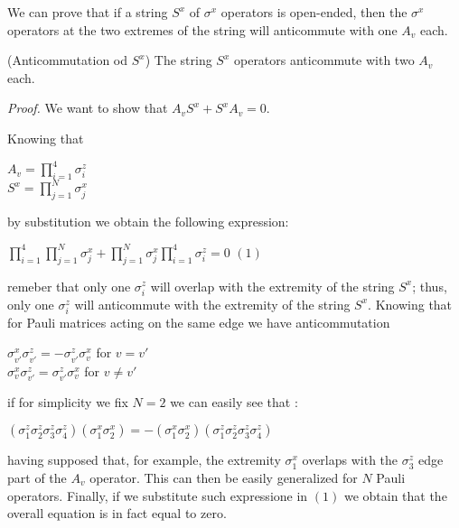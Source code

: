 




\newpage
We can prove that if a string $S^x$ of $\sigma^x$ operators is open-ended, then the $\sigma^x$ operators at the two extremes of the string will anticommute with one $A_v$ each. 

\begin{proposition}(Anticommutation od $S^x$)
	The string $S^x$ operators anticommute with two $A_v$ each.
\end{proposition}

\textit{Proof.}\newline
We want to show that $A_v S^x + S^x A_v=0$.\newline

Knowing that 

\begin{center}
	$A_v = \prod_{i=1}^{4} \sigma_i^z$ \\ 
	$S^x = \prod_{j=1}^{N} \sigma_j^x$
\end{center}

by substitution we obtain the following expression: \newline

\begin{center}
	$\prod_{i=1}^{4} \prod_{j=1}^{N} \sigma_j^x + \prod_{j=1}^{N} \sigma_j^x \prod_{i=1}^{4} \sigma_i^z = 0$ $(1)$
\end{center}

remeber that only one $\sigma_i^z$ will overlap with the extremity of the string $S^x$; thus, only one $\sigma_i^z$ will anticommute with the extremity of the string $S^x$. Knowing that for Pauli matrices acting on the same edge we have anticommutation

\begin{center}
	$\sigma_{v'}^x \sigma_{v'}^z = - \sigma_{v'}^z \sigma_v^x$ for $v=v'$ \\
	$\sigma_v^x \sigma_{v'}^z =  \sigma_{v'}^z \sigma_v^x$ for $v \neq v'$ 
\end{center}

if for simplicity we fix $N=2$ we can easily see that :\newline

\begin{center}
	$(\sigma_1^z \sigma_2^z \sigma_3^z \sigma_4^z)(\sigma_1^x \sigma_2^x)  = - (\sigma_1^x \sigma_2^x)(\sigma_1^z \sigma_2^z \sigma_3^z \sigma_4^z) $ 
\end{center}

having supposed that, for example, the extremity $\sigma_1^x$ overlaps with the $\sigma_3^z$ edge part of the $A_v$ operator. This can then be easily generalized for $N$ Pauli operators. Finally, if we substitute such expressione in $(1)$ we obtain that the overall equation is in fact equal to zero.\newline

